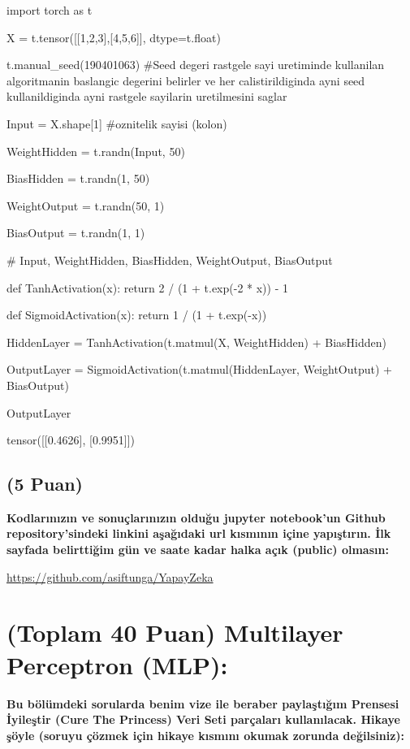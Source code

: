 \documentclass[11pt]{article}
\begin{document}
\begin{python}
import torch as t

X = t.tensor([[1,2,3],[4,5,6]], dtype=t.float)

t.manual_seed(190401063) 
#Seed degeri rastgele sayi uretiminde kullanilan algoritmanin baslangic degerini belirler ve her calistirildiginda ayni seed kullanildiginda ayni rastgele sayilarin uretilmesini saglar

Input = X.shape[1] #oznitelik sayisi (kolon)

WeightHidden = t.randn(Input, 50)

BiasHidden = t.randn(1, 50)

WeightOutput = t.randn(50, 1)

BiasOutput = t.randn(1, 1)

# Input, WeightHidden, BiasHidden, WeightOutput, BiasOutput

def TanhActivation(x):
    return 2 / (1 + t.exp(-2 * x)) - 1

def SigmoidActivation(x):
    return 1 / (1 + t.exp(-x))

HiddenLayer = TanhActivation(t.matmul(X, WeightHidden) + BiasHidden)

OutputLayer = SigmoidActivation(t.matmul(HiddenLayer, WeightOutput) + BiasOutput)

OutputLayer
\end{python}

tensor([[0.4626],
        [0.9951]])

\subsection{(5 Puan)} \textbf{Kodlarınızın ve sonuçlarınızın olduğu jupyter notebook'un Github repository'sindeki linkini aşağıdaki url kısmının içine yapıştırın. İlk sayfada belirttiğim gün ve saate kadar halka açık (public) olmasın:}

\url{https://github.com/asiftunga/YapayZeka}

\section{(Toplam 40 Puan) Multilayer Perceptron (MLP):} 
\textbf{Bu bölümdeki sorularda benim vize ile beraber paylaştığım Prensesi İyileştir (Cure The Princess) Veri Seti parçaları kullanılacak. Hikaye şöyle (soruyu çözmek için hikaye kısmını okumak zorunda değilsiniz):} 
\end{document}

